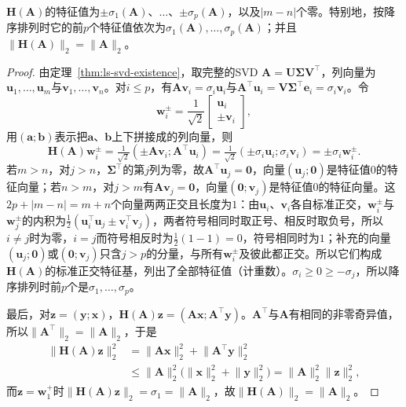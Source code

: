 \begin{lemma}[对称增广矩阵的谱]
\label{lem:ls-symmetric-augmentation-spectrum}
$\bm H(\bm A)$的特征值为$\pm\sigma_1(\bm A)$、$\ldots$、$\pm\sigma_p(\bm A)$，以及$|m-n|$个零。特别地，按降序排列时它的前$p$个特征值依次为$\sigma_1(\bm A),\ldots,\sigma_p(\bm A)$；并且$\lVert\bm H(\bm A)\rVert_2=\lVert\bm A\rVert_2$。
\end{lemma}
\begin{proof}
由定理~\ref{thm:ls-svd-existence}，取完整的SVD $\bm A=\bm U\bm\Sigma\bm V^\top$，列向量为$\bm u_1,\ldots,\bm u_m$与$\bm v_1,\ldots,\bm v_n$。对$i\leq p$，有$\bm A\bm v_i=\sigma_i\bm u_i$与$\bm A^\top\bm u_i=\bm V\bm\Sigma^\top\bm e_i=\sigma_i\bm v_i$。令
\[
 \bm w_i^{\pm}=\frac1{\sqrt2}\begin{bmatrix}\bm u_i\\\pm\bm v_i\end{bmatrix},
\]
用$(\bm a;\bm b)$表示把$\bm a$、$\bm b$上下拼接成的列向量，则
\[
 \bm H(\bm A)\bm w_i^{\pm}=\tfrac1{\sqrt2}(\pm\bm A\bm v_i;\bm A^\top\bm u_i)=\tfrac1{\sqrt2}(\pm\sigma_i\bm u_i;\sigma_i\bm v_i)=\pm\sigma_i\bm w_i^{\pm}.
\]
若$m>n$，对$j>n$，$\bm\Sigma^\top$的第$j$列为零，故$\bm A^\top\bm u_j=\bm0$，向量$(\bm u_j;\bm0)$是特征值$0$的特征向量；若$n>m$，对$j>m$有$\bm A\bm v_j=\bm0$，向量$(\bm0;\bm v_j)$是特征值$0$的特征向量。这$2p+|m-n|=m+n$个向量两两正交且长度为$1$：由$\bm u_i$、$\bm v_i$各自标准正交，$\bm w_i^{\pm}$与$\bm w_j^{\pm}$的内积为$\tfrac12(\bm u_i^\top\bm u_j\pm\bm v_i^\top\bm v_j)$，两者符号相同时取正号、相反时取负号，所以$i\neq j$时为零，$i=j$而符号相反时为$\tfrac12(1-1)=0$，符号相同时为$1$；补充的向量$(\bm u_j;\bm0)$或$(\bm0;\bm v_j)$只含$j>p$的分量，与所有$\bm w_i^{\pm}$及彼此都正交。所以它们构成$\bm H(\bm A)$的标准正交特征基，列出了全部特征值（计重数）。$\sigma_i\geq0\geq-\sigma_j$，所以降序排列时前$p$个是$\sigma_1,\ldots,\sigma_p$。

最后，对$\bm z=(\bm y;\bm x)$，$\bm H(\bm A)\bm z=(\bm A\bm x;\bm A^\top\bm y)$。$\bm A^\top$与$\bm A$有相同的非零奇异值，所以$\lVert\bm A^\top\rVert_2=\lVert\bm A\rVert_2$，于是
\[
 \begin{aligned}
 \lVert\bm H(\bm A)\bm z\rVert_2^2
 &=\lVert\bm A\bm x\rVert_2^2+\lVert\bm A^\top\bm y\rVert_2^2\\
 &\leq\lVert\bm A\rVert_2^2\bigl(\lVert\bm x\rVert_2^2+\lVert\bm y\rVert_2^2\bigr)
 =\lVert\bm A\rVert_2^2\lVert\bm z\rVert_2^2 ,
 \end{aligned}
\]
而$\bm z=\bm w_1^+$时$\lVert\bm H(\bm A)\bm z\rVert_2=\sigma_1=\lVert\bm A\rVert_2$，故$\lVert\bm H(\bm A)\rVert_2=\lVert\bm A\rVert_2$。
\end{proof}

